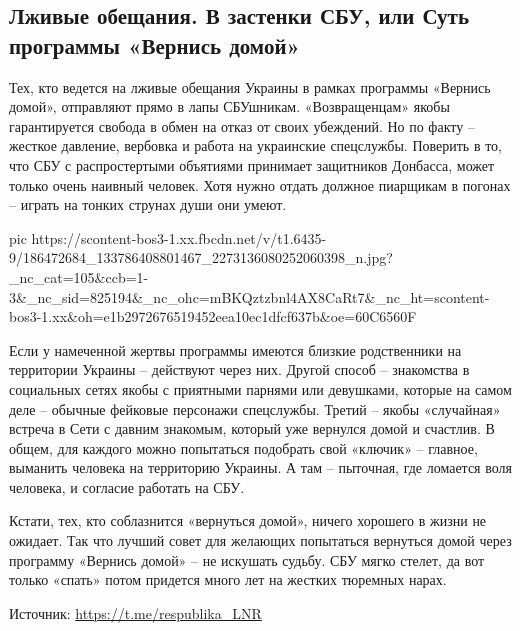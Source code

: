  
 
 
 
 
\subsection{Лживые обещания. В застенки СБУ, или Суть программы «Вернись домой»}

Тех, кто ведется на лживые обещания Украины в рамках программы «Вернись домой»,
отправляют прямо в лапы СБУшникам. «Возвращенцам» якобы гарантируется свобода в
обмен на отказ от своих убеждений. Но по факту – жесткое давление, вербовка и
работа на украинские спецслужбы. Поверить в то, что СБУ с распростертыми
объятиями принимает защитников Донбасса, может только очень наивный человек.
Хотя нужно отдать должное пиарщикам в погонах – играть на тонких струнах души
они умеют.


\ifcmt
  pic https://scontent-bos3-1.xx.fbcdn.net/v/t1.6435-9/186472684_133786408801467_2273136080252060398_n.jpg?_nc_cat=105&ccb=1-3&_nc_sid=825194&_nc_ohc=mBKQztzbnl4AX8CaRt7&_nc_ht=scontent-bos3-1.xx&oh=e1b2972676519452eea10ec1dfcf637b&oe=60C6560F
\fi


Если у намеченной жертвы программы имеются близкие родственники на территории
Украины – действуют через них. Другой способ – знакомства в социальных сетях
якобы с приятными парнями или девушками, которые на самом деле – обычные
фейковые персонажи спецслужбы. Третий – якобы «случайная» встреча в Сети с
давним знакомым, который уже вернулся домой и счастлив. В общем, для каждого
можно попытаться подобрать свой «ключик» – главное, выманить человека на
территорию Украины. А там – пыточная, где ломается воля человека, и согласие
работать на СБУ.

Кстати, тех, кто соблазнится «вернуться домой», ничего хорошего в жизни не
ожидает. Так что лучший совет для желающих попытаться вернуться домой через
программу «Вернись домой» – не искушать судьбу. СБУ мягко стелет, да вот только
«спать» потом придется много лет на жестких тюремных нарах.

Источник:  \url{https://t.me/respublika_LNR}

